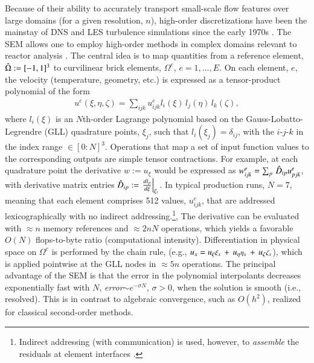 Because of their ability to accurately transport small-scale flow features over
large domains (for a given resolution, $n$), high-order discretizations have
been the mainstay of DNS and LES turbulence simulations since the early 1970s
\cite{kreiss72,sao72}.   The SEM allows one to employ high-order methods in
complex domains relevant to reactor analysis  \cite{pat84,sao80}.
The central idea is to map
quantities from a reference element, ${\hat \Omega}:=[-1,1]^3$ to curvilinear brick
elements, $\Omega^e$, $e=1,\dots,E$.  On each element, $e$, the velocity
(temperature, geometry, etc.) is expressed as a tensor-product polynomial
of the form
\begin{eqnarray}
  u^e(\xi,\eta,\zeta) = \sum_{ijk} u_{ijk}^e l_i(\xi) \, l_j(\eta) \, l_k(\zeta),
\end{eqnarray}
where $l_i(\xi)$ is an $N$th-order Lagrange polynomial based on the
Gauss-Lobatto-Legrendre (GLL) quadrature points, $\xi_j$, such that
$l_i(\xi_j)=\delta_{ij}$, with the $i$-$j$-$k$ in the index range $\in
[0:N]^3$.  Operations that map a set of input function values to the
corresponding outputs are simple tensor contractions.
For example, at each quadrature point the derivative $w := u_{\xi}$ would be
expressed as $w^e_{ijk} = \sum_p \, {\hat D}_{ip} u_{pjk}^e$, with derivative
matrix entries ${\hat D}_{ip} := \left. \frac{d l_p}{d \xi} \right|_{\xi_i}$.   In typical
production runs, $N=7$, meaning that each element comprises 512 values,
$u_{ijk}^e$, that are addressed lexicographically with no indirect
addressing.\footnote{Indirect addressing (with communication) is used,
however, to {\em assemble} the residuals at element interfaces \cite{dfm02}.},
The derivative can be evaluated with $\approx n$ memory references and
$\approx 2nN$ operations, which yields a favorable $O(N)$ flops-to-byte ratio
(computational intensity).
Differentiation in physical space on $\Omega^e$ is performed by the chain rule,
(e.g., $u_x =
u_{\xi}   \mbox{\footnotesize $\xi_x$}    \,+\,
u_{\eta}  \mbox{\footnotesize $\eta_x$}   \,+\,
u_{\zeta} \mbox{\footnotesize $\zeta_x$}  $),
which is applied pointwise at the GLL nodes in $\approx 5n$ operations.
The principal advantage of the SEM is that the error in the polynomial
interpolants decreases exponentially fast with $N$, {\em error}$\sim e^{-\sigma
N}$, $\sigma > 0$, when the solution is smooth (i.e., resolved).
This is in contrast to algebraic convergence, such as $O(h^2)$, realized
for classical second-order methods.


